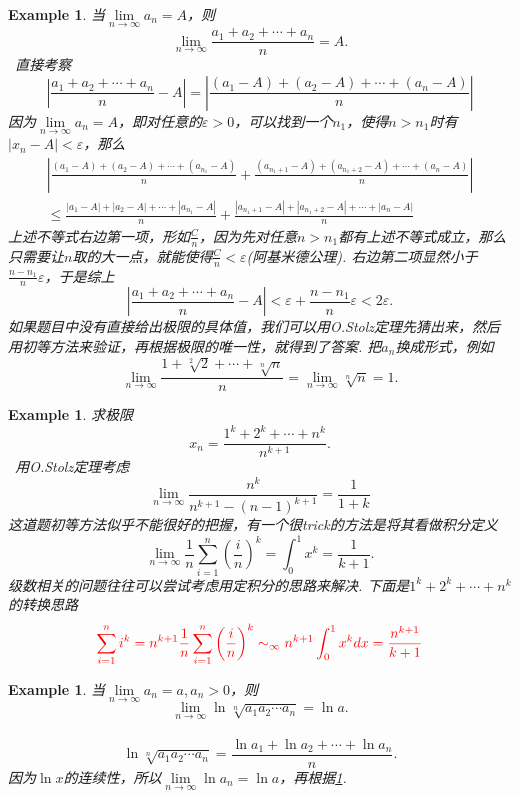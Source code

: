 \documentclass{article}
\newtheorem{example}[theorem]{Example}
\newcommand{\hints}{{\color{blue} \text{hints}}}
\begin{document}
\begin{example} \label{ex:jishu1}
\rm 当$\lim\limits_{n \rightarrow \infty} a_n = A$，则
$$
\lim\limits_{n \rightarrow \infty} \frac{a_1+a_2+\cdots+a_n}{n} = A.
$$
\hints\ 直接考察
$$
\left|\frac{a_1+a_2+\cdots+a_n}{n} - A \right| = \left| \frac{(a_1-A)+(a_2-A)+\cdots+(a_n-A)}{n} \right|
$$
因为$\lim\limits_{n \rightarrow \infty} a_n = A$，即对任意的$\varepsilon > 0$，可以找到一个$n_1$，使得$n > n_1$时有$|x_n - A| < \varepsilon$，那么
$$
\begin{array}{ll}
\left|\frac{(a_1-A) + (a_2-A) + \cdots + (a_{n_1}-A)}{n} + \frac{(a_{n_1 + 1}-A)+ (a_{n_1 + 2}-A) + \cdots + (a_{n}-A)}{n} \right| \\ \leq \frac{|a_1-A| + |a_2-A| + \cdots + |a_{n_1}-A|}{n} + \frac{|a_{n_1 + 1}-A|+ |a_{n_1 + 2}-A| + \cdots + |a_{n}-A|}{n}
\end{array}
$$
上述不等式右边第一项，形如$\frac{C}{n}$，因为先对任意$n > n_1$都有上述不等式成立，那么只需要让$n$取的大一点，就能使得$\frac{C}{n} < \varepsilon$({\color{red}阿基米德公理}). 右边第二项显然小于$\frac{n-n_1}{n}\varepsilon$，于是综上
$$
\left|\frac{a_1+a_2+\cdots+a_n}{n} - A \right| < \varepsilon+\frac{n-n_1}{n}\varepsilon < 2\varepsilon.
$$
{\color{blue}如果题目中没有直接给出极限的具体值，我们可以用O.Stolz定理先猜出来，然后用初等方法来验证，再根据极限的唯一性，就得到了答案}. 把$a_n$换成形式，例如
$$
\lim\limits_{n \rightarrow \infty} \frac{1+\sqrt[2]{2}+\cdots+\sqrt[n]{n}}{n} = \lim\limits_{n \rightarrow \infty} \sqrt[n]{n} = 1.
$$ 
\end{example}


\begin{example}
\rm 求极限
$$
x_n  = \frac{1^k + 2^k + \cdots + n^k}{n^{k+1}}.
$$
\hints\ 用O.Stolz定理考虑
$$
\lim\limits_{n \rightarrow \infty} \frac{n^k}{n^{k+1} - (n-1)^{k+1}} = \frac{1}{1+k}
$$
这道题初等方法似乎不能很好的把握，有一个很trick的方法是将其看做积分定义
$$
\lim\limits_{n \rightarrow \infty} \frac{1}{n} \sum\limits_{i=1}^n \left(\frac{i}{n}\right)^k = \int_0^1 x^k = \frac{1}{k+1}. 
$$
{\color{blue} 级数相关的问题往往可以尝试考虑用定积分的思路来解决}. 下面是$1^k + 2^k +\cdots + n^k$的转换思路
$$
{\color{red}
\sum_{i=1}^n i^k=n^{k+1}\frac1n\sum_{i=1}^n \left(\frac in\right)^k\sim_\infty n^{k+1}\int_0^1 x^kdx=\frac{n^{k+1}}{k+1}
}
$$
\end{example}

\newpage
\begin{example}\label{ex:jishu2}
\rm 当$\lim\limits_{n \rightarrow \infty} a_n = a, a_n > 0$，则
$$
\lim\limits_{n \rightarrow \infty } \ln \sqrt[n]{a_1a_2\cdots a_n} = \ln a.
$$
\hints\
$$
\ln \sqrt[n]{a_1a_2\cdots a_n} = \frac{\ln a_1 + \ln a_2 + \cdots + \ln a_n}{n}.
$$
因为$\ln x$的连续性，所以$\lim\limits_{n \to \infty} \ln a_n = \ln a$，再根据\ref{ex:jishu1}. 
\end{example}
\end{document}
